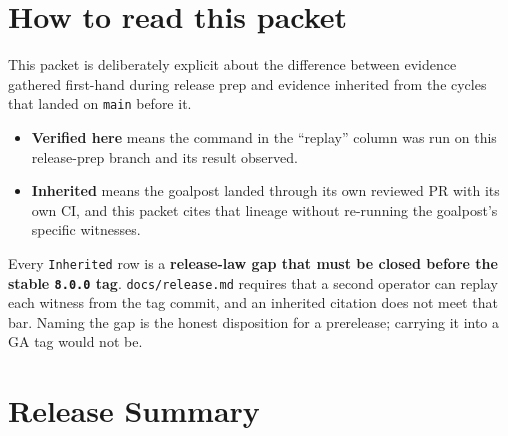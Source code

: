 \section{How to read this packet}\label{record-262-how-to-read-this-packet}

This packet is deliberately explicit about the difference between evidence gathered first-hand during release prep and evidence inherited from the cycles that landed on \texttt{m\allowbreak{}a\allowbreak{}i\allowbreak{}n} before it.

\begin{itemize}
\tightlist
\item
  \textbf{Verified here} means the command in the ``replay'' column was run on this release-prep branch and its result observed.
\item
  \textbf{Inherited} means the goalpost landed through its own reviewed PR with its own CI, and this packet cites that lineage without re-running the goalpost's specific witnesses.
\end{itemize}

Every \texttt{I\allowbreak{}n\allowbreak{}h\allowbreak{}e\allowbreak{}r\allowbreak{}i\allowbreak{}t\allowbreak{}e\allowbreak{}d} row is a \textbf{release-law gap that must be closed before the stable \texttt{8\allowbreak{}.\allowbreak{}0\allowbreak{}.\allowbreak{}0} tag}. \texttt{d\allowbreak{}o\allowbreak{}c\allowbreak{}s\allowbreak{}/\allowbreak{}r\allowbreak{}e\allowbreak{}l\allowbreak{}e\allowbreak{}a\allowbreak{}s\allowbreak{}e\allowbreak{}.\allowbreak{}m\allowbreak{}d} requires that a second operator can replay each witness from the tag commit, and an inherited citation does not meet that bar. Naming the gap is the honest disposition for a prerelease; carrying it into a GA tag would not be.

\section{Release Summary}\label{record-262-release-summary}

